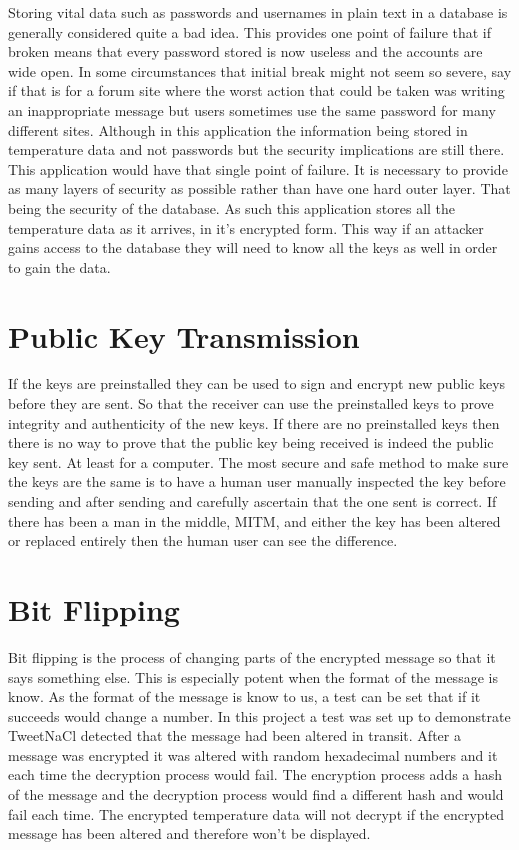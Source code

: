 Storing vital data such as passwords and usernames in plain text in a database is generally considered quite a bad idea. This provides one point of failure that if broken means that every password stored is now useless and the accounts are wide open. In some circumstances that initial break might not seem so severe, say if that is for a forum site where the worst action that could be taken was writing an inappropriate message but users sometimes use the same password for many different sites. Although in this application the information being stored in temperature data and not passwords but the security implications are still there. This application would have that single point of failure. It is necessary to provide as many layers of security as possible rather than have one hard outer layer. That being the security of the database. As such this application stores all the temperature data as it arrives, in it's encrypted form. This way if an attacker gains access to the database they will need to know all the keys as well in order to gain the data.

\section{Public Key Transmission}

If the keys are preinstalled they can be used to sign and encrypt new public keys before they are sent. So that the receiver can use the preinstalled keys to prove integrity and authenticity of the new keys. If there are no preinstalled keys then there is no way to prove that the public key being received is indeed the public key sent. At least for a computer. The most secure and safe method to make sure the keys are the same is to have a human user manually inspected the key before sending and after sending and carefully ascertain that the one sent is correct. If there has been a man in the middle, MITM, and either the key has been altered or replaced entirely then the human user can see the difference. 

\section{Bit Flipping}

Bit flipping is the process of changing parts of the encrypted message so that it says something else. This is especially potent when the format of the message is know. As the format of the message is know to us, a test can be set that if it succeeds would change a number. In this project a test was set up to demonstrate TweetNaCl detected that the message had been altered in transit. After a message was encrypted it was altered with random hexadecimal numbers and it each time the decryption process would fail. The encryption process adds a hash of the message and the decryption process would find a different hash and would fail each time. The encrypted temperature data will not decrypt if the encrypted message has been altered and therefore won't be displayed.

